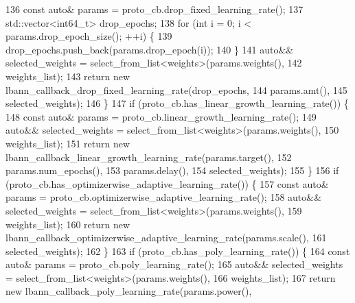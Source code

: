 \begin{DoxyCode}
136     \textcolor{keyword}{const} \textcolor{keyword}{auto}& params = proto\_cb.drop\_fixed\_learning\_rate();
137     std::vector<int64\_t> drop\_epochs;
138     \textcolor{keywordflow}{for} (\textcolor{keywordtype}{int} i = 0; i < params.drop\_epoch\_size(); ++i) \{
139       drop\_epochs.push\_back(params.drop\_epoch(i));
140     \}
141     \textcolor{keyword}{auto}&& selected\_weights = select\_from\_list<weights>(params.weights(),
142                                                         weights\_list);
143     \textcolor{keywordflow}{return} \textcolor{keyword}{new} lbann\_callback\_drop\_fixed\_learning\_rate(drop\_epochs,
144                                                        params.amt(),
145                                                        selected\_weights);
146   \}
147   \textcolor{keywordflow}{if} (proto\_cb.has\_linear\_growth\_learning\_rate()) \{
148     \textcolor{keyword}{const} \textcolor{keyword}{auto}& params = proto\_cb.linear\_growth\_learning\_rate();
149     \textcolor{keyword}{auto}&& selected\_weights = select\_from\_list<weights>(params.weights(),
150                                                         weights\_list);
151     \textcolor{keywordflow}{return} \textcolor{keyword}{new} lbann\_callback\_linear\_growth\_learning\_rate(params.target(),
152                                                           params.num\_epochs(),
153                                                           params.delay(),
154                                                           selected\_weights);
155   \}
156   \textcolor{keywordflow}{if} (proto\_cb.has\_optimizerwise\_adaptive\_learning\_rate()) \{
157     \textcolor{keyword}{const} \textcolor{keyword}{auto}& params = proto\_cb.optimizerwise\_adaptive\_learning\_rate();
158     \textcolor{keyword}{auto}&& selected\_weights = select\_from\_list<weights>(params.weights(),
159                                                         weights\_list);
160     \textcolor{keywordflow}{return} \textcolor{keyword}{new} lbann\_callback\_optimizerwise\_adaptive\_learning\_rate(params.scale(),
161                                                                    selected\_weights);
162   \}
163   \textcolor{keywordflow}{if} (proto\_cb.has\_poly\_learning\_rate()) \{
164     \textcolor{keyword}{const} \textcolor{keyword}{auto}& params = proto\_cb.poly\_learning\_rate();
165     \textcolor{keyword}{auto}&& selected\_weights = select\_from\_list<weights>(params.weights(),
166                                                         weights\_list);
167     \textcolor{keywordflow}{return} \textcolor{keyword}{new} lbann\_callback\_poly\_learning\_rate(params.power(),

\end{DoxyCode}
